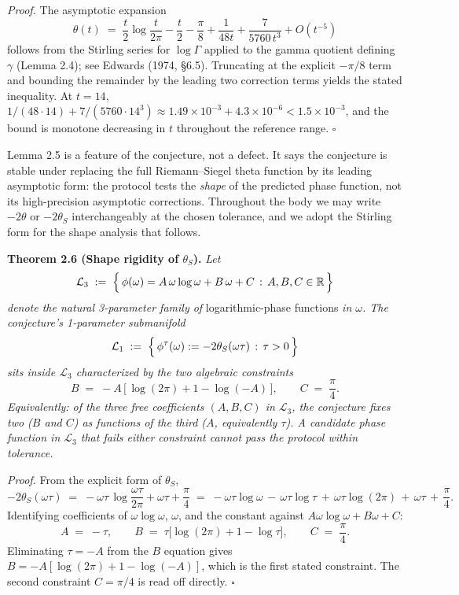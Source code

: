 \documentclass[
  letterpaper,
  11pt]{article}
\theoremstyle{plain}
\theoremstyle{definition}
\theoremstyle{remark}
\begin{document}
\emph{Proof.} The asymptotic expansion
\[\theta(t) \;=\; \frac{t}{2}\log\frac{t}{2\pi} - \frac{t}{2} - \frac{\pi}{8} + \frac{1}{48t} + \frac{7}{5760\,t^3} + O(t^{-5})\]
follows from the Stirling series for \(\log\Gamma\) applied to the gamma quotient defining \(\gamma\) (Lemma 2.4); see Edwards (1974, §6.5). Truncating at the explicit \(-\pi/8\) term and bounding the remainder by the leading two correction terms yields the stated inequality. At \(t = 14\), \(1/(48 \cdot 14) + 7/(5760 \cdot 14^3) \approx 1.49 \times 10^{-3} + 4.3 \times 10^{-6} < 1.5 \times 10^{-3}\), and the bound is monotone decreasing in \(t\) throughout the reference range. \(\square\)

Lemma 2.5 is a feature of the conjecture, not a defect. It says the conjecture is stable under replacing the full Riemann--Siegel theta function by its leading asymptotic form: the protocol tests the \emph{shape} of the predicted phase function, not its high-precision asymptotic corrections. Throughout the body we may write \(-2\theta\) or \(-2\theta_S\) interchangeably at the chosen tolerance, and we adopt the Stirling form for the shape analysis that follows.

\textbf{Theorem 2.6 (Shape rigidity of \(\theta_S\)).} \emph{Let}
\[\mathcal{L}_3 \;:=\; \Bigl\{\,\phi(\omega) = A\,\omega\log\omega + B\,\omega + C \,:\, A, B, C \in \mathbb{R}\,\Bigr\}\]
\emph{denote the natural 3-parameter family of} logarithmic-phase functions \emph{in \(\omega\). The conjecture's 1-parameter submanifold}
\[\mathcal{L}_1 \;:=\; \Bigl\{\,\phi^\tau(\omega) := -2\theta_S(\omega\tau) \,:\, \tau > 0\,\Bigr\}\]
\emph{sits inside \(\mathcal{L}_3\) characterized by the two algebraic constraints}
\[B \;=\; -A\,\bigl[\,\log(2\pi) + 1 - \log(-A)\,\bigr], \qquad C \;=\; \frac{\pi}{4}.\]
\emph{Equivalently: of the three free coefficients \((A, B, C)\) in \(\mathcal{L}_3\), the conjecture fixes two (\(B\) and \(C\)) as functions of the third (\(A\), equivalently \(\tau\)). A candidate phase function in \(\mathcal{L}_3\) that fails either constraint cannot pass the protocol within tolerance.}

\emph{Proof.} From the explicit form of \(\theta_S\),
\[
-2\theta_S(\omega\tau) \;=\; -\omega\tau\,\log\frac{\omega\tau}{2\pi} + \omega\tau + \frac{\pi}{4}
\;=\; -\omega\tau\log\omega \,-\, \omega\tau\log\tau \,+\, \omega\tau\log(2\pi) \,+\, \omega\tau \,+\, \frac{\pi}{4}.
\]
Identifying coefficients of \(\omega\log\omega\), \(\omega\), and the constant against \(A\omega\log\omega + B\omega + C\):
\[A \;=\; -\tau, \qquad B \;=\; \tau\bigl[\log(2\pi) + 1 - \log\tau\bigr], \qquad C \;=\; \frac{\pi}{4}.\]
Eliminating \(\tau = -A\) from the \(B\) equation gives \(B = -A[\log(2\pi) + 1 - \log(-A)]\), which is the first stated constraint. The second constraint \(C = \pi/4\) is read off directly. \(\square\)
\end{document}
